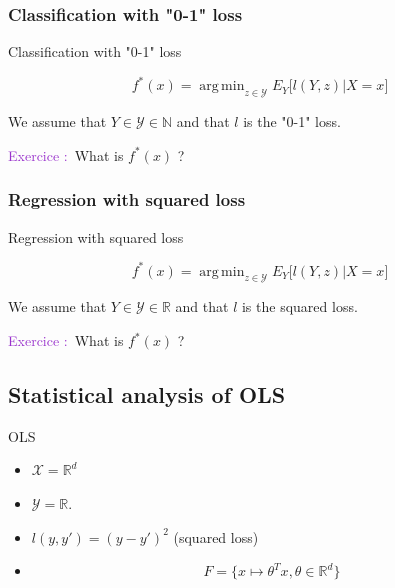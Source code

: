 \documentclass[usenames,dvipsnames]{beamer}
\DeclareMathOperator*{\argmin}{arg\,min}
\newcounter{numexos}%
\newcommand{\exercice}[1]{%
\addtocounter{numexos}{1}%
\textcolor{DarkOrchid}{Exercice\,\thenumexos\,:}\,#1%
}
\begin{document}
\subsubsection{Classification with "0-1" loss}%
\label{ssub:Classification with "0-1" loss}

\begin{frame}{Classification with "0-1" loss}

	\begin{equation}
	    \label{eq:bayes}
	    f^*(x) = \argmin_{z\in \mathcal{Y} }E_Y\big[ l(Y, z)|X=x\big]
	\end{equation}

    We assume that $Y\in\mathcal{Y}\in \mathbb{N}$ and that $l$ is the "0-1" loss.
    \vspace{\baselineskip}

    \exercice{} What is $f^*(x)$ ?


\end{frame}


\subsubsection{Regression with squared loss}%
\label{ssub:Regression with squared loss}


\begin{frame}{Regression with squared loss}

	\begin{equation}
	    \label{eq:bayes}
	    f^*(x) = \argmin_{z\in \mathcal{Y} }E_Y\big[ l(Y, z)|X=x\big]
	\end{equation}

    We assume that $Y\in\mathcal{Y}\in \mathbb{R}$ and that $l$ is the squared loss.
    \vspace{\baselineskip}

    \exercice{} What is $f^*(x)$ ?

\end{frame}

\subsection{Statistical analysis of OLS}%
\label{sub:statistical_analysis_of_ols}
\frame{\tableofcontents[currentsection]}

\begin{frame}{OLS}
    \begin{itemize}
	\item $ \mathcal{X} = \mathbb{R}^d$
	\item $ \mathcal{Y} = \mathbb{R} $.
	\item $   l(y,y') = (y-y')^2 $ (squared loss)
	\item
	    \begin{equation*}
		F = \{ x\mapsto \theta^T x, \theta \in \mathbb{R}^d\}
	    \end{equation*}
    \end{itemize}
\end{frame}
\end{document}
